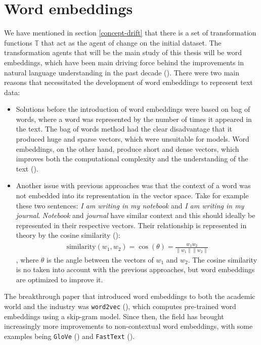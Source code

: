 \documentclass[12pt]{extreport}
\begin{document}
\section{Word embeddings} \label{sec:word-embeddings}

We have mentioned in section \ref{concept-drift} that there is a set of transformation functions $\mathbb{T}$ that act as the agent of change on the initial dataset. The transformation agents that will be the main study of this thesis will be word embeddings, which have been main driving force behind the improvements in natural language understanding in the past decade (\cite{word-embedding-survey}). There were two main reasons that necessitated the development of word embeddings to represent text data:

\begin{itemize}
    \item Solutions before the introduction of word embeddings were based on bag of words, where a word was represented by the number of times it appeared in the text. The bag of words method had the clear disadvantage that it produced huge and sparse vectors, which were unsuitable for models. Word embeddings, on the other hand, produce short and dense vectors, which improves both the computational complexity and the understanding of the text (\cite{word-embedding-survey, word2vec}).
    \item Another issue with previous approaches was that the context of a word was not embedded into its representation in the vector space. Take for example these two sentences: \emph{I am writing in my notebook} and \emph{I am writing in my journal}. \emph{Notebook} and \emph{journal} have similar context and this should ideally be represented in their respective vectors. Their relationship is represented in theory by the cosine similarity (\cite{word2vec}): \begin{align}\text{similarity}(w_1, w_2) = \cos(\theta) = \frac{w_1 \dot w_2}{\lVert w_1 \rVert \lVert w_2 \rVert}\end{align}, where $\theta$ is the angle between the vectors of $w_1$ and $w_2$. The cosine similarity is no taken into account with the previous approaches, but word embeddings are optimized to improve it.
\end{itemize}

The breakthrough paper that introduced word embeddings to both the academic world and the industry was \texttt{word2vec} (\cite{word2vec}), which computes pre-trained word embeddings using a skip-gram model. Since then, the field has brought increasingly more improvements to non-contextual word embeddings, with some examples being \texttt{GloVe} (\cite{glove}) and \texttt{FastText} (\cite{fasttext}).
\end{document}
